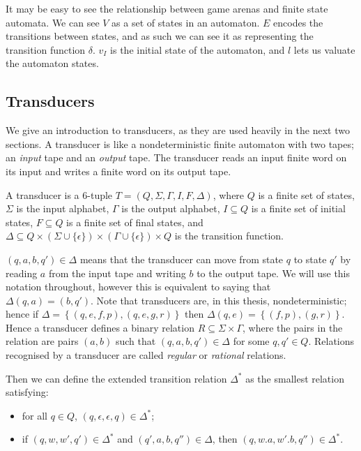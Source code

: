 \documentclass[10pt, a4paper]{report}
\begin{document}
It may be easy to see the relationship between game arenas and finite state
automata. We can see $V$ as a set of states in an automaton. $E$ encodes the
transitions between states, and as such we can see it as representing the
transition function $\delta$. $v_I$ is the initial state of the automaton, and
$l$ lets us valuate the automaton states. 

\subsection{Transducers}
\label{sec:Transducers}

We give an introduction to transducers, as they are used heavily in the next two
sections. A transducer is like a nondeterministic finite automaton with two
tapes; an \emph{input} tape and an \emph{output} tape. The transducer reads
an input finite word on its input and writes a finite word on its output tape.

A transducer is a 6-tuple $T = (Q, \Sigma, \Gamma, I, F, \Delta)$, where $Q$ is
a finite set of states, $\Sigma$ is the input alphabet, $\Gamma$ is the output
alphabet, $I \subseteq Q$ is a finite set of initial states, $F \subseteq Q$ is
a finite set of final states, and $\Delta \subseteq Q \times \left( \Sigma \cup
  \{\epsilon\} \right) \times \left( \Gamma \cup \{\epsilon\} \right) \times Q$
is the transition function.

$(q, a, b, q') \in \Delta$ means that the transducer can move from state $q$ to
state $q'$ by reading $a$ from the input tape and writing $b$ to the output
tape. We will use this notation throughout, however this is equivalent to saying
that $\Delta(q, a) = (b, q')$. Note that transducers are, in this thesis,
nondeterministic; hence if $\Delta = \left\{ (q, e, f, p), (q, e, g, r)
\right\}$ then $\Delta(q, e) = \left\{ (f, p), (g, r) \right\}$. Hence a
transducer defines a binary relation $R \subseteq \Sigma \times \Gamma$, where
the pairs in the relation are pairs $(a, b)$ such that $(q, a, b, q') \in
\Delta$ for some $q, q' \in Q$. Relations recognised by a transducer are
called \emph{regular} or \emph{rational} relations.

Then we can define the extended transition relation $\Delta^\ast$ as the
smallest relation satisfying:

\begin{itemize}
\item for all $q \in Q$, $(q, \epsilon, \epsilon, q) \in \Delta^\ast$;
\item if $(q, w, w', q') \in \Delta^\ast$ and $(q', a, b, q'') \in \Delta$, then
  $(q, w . a, w' . b, q'') \in \Delta^\ast$.
  
\end{itemize}
\end{document}
